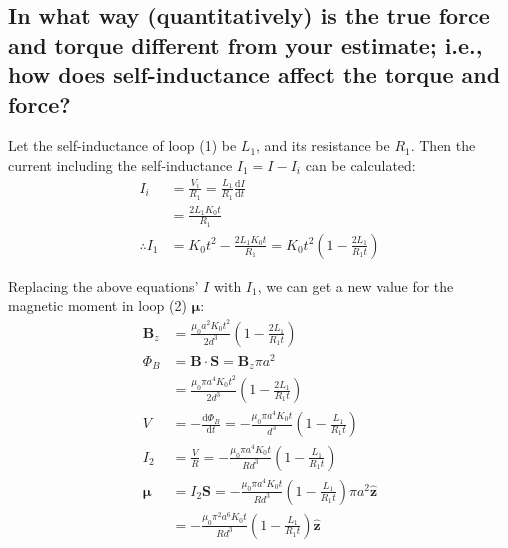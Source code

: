 \documentclass[a4paper]{scrartcl}
\begin{document}
\subsection{In what way (quantitatively) is the true force and torque different from your estimate; i.e., how does self-inductance affect the torque and force?}
Let the self-inductance of loop (1) be \(L_1\), and its resistance be \(R_1\). Then the current including the self-inductance \(I_1 = I - I_i\) can be calculated:
\begin{align*}
    I_i &= \frac{V_i}{R_1} = \frac{L_1}{R_1} \frac{\mathrm{d}I}{\mathrm{d}t} \\
    &= \frac{2 L_1 K_0 t}{R_1} \\
    \therefore I_1 &= K_0 t^2 - \frac{2 L_1 K_0 t}{R_1} = K_0 t^2 \left( 1 - \frac{2 L_1}{R_1 t} \right)
\end{align*}

Replacing the above equations' \(I\) with \(I_1\), we can get a new value for the magnetic moment in loop (2) \(\boldsymbol{\mu}\):
\begin{align*}
    \mathbf{B}_z &= \frac{\mu_0 a^2 K_0 t^2}{2 d^3} \left( 1 - \frac{2 L_1}{R_1 t} \right) \\
    \Phi_B &= \mathbf{B} \cdot \mathbf{S} = \mathbf{B}_z \pi a^2 \\
    &= \frac{\mu_0 \pi a^4 K_0 t^2}{2 d^3} \left( 1 - \frac{2 L_1}{R_1 t} \right) \\
    V &= -\frac{\mathrm{d}\Phi_B}{\mathrm{d}t} = -\frac{\mu_0 \pi a^4 K_0 t}{d^3} \left( 1 - \frac{L_1}{R_1 t} \right) \\
    I_2 &= \frac{V}{R} = -\frac{\mu_0 \pi a^4 K_0 t}{R d^3} \left( 1 - \frac{L_1}{R_1 t} \right) \\
    \boldsymbol{\mu} &= I_2 \mathbf{S} = -\frac{\mu_0 \pi a^4 K_0 t}{R d^3} \left( 1 - \frac{L_1}{R_1 t} \right) \pi a^2 \hat{\mathbf{z}} \\
    &= -\frac{\mu_0 \pi^2 a^6 K_0 t}{R d^3} \left( 1 - \frac{L_1}{R_1 t} \right) \hat{\mathbf{z}}
\end{align*}
\end{document}
